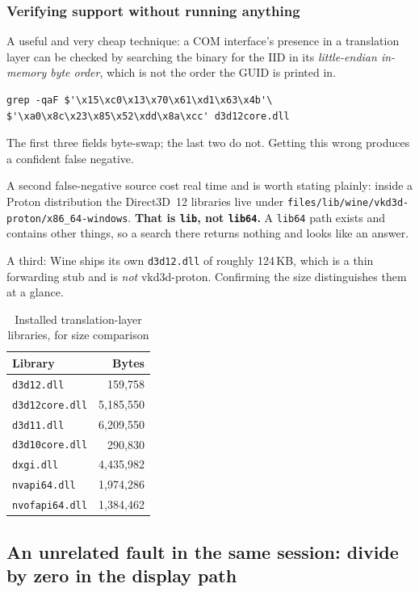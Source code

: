 \subsubsection{Verifying support without running anything}

A useful and very cheap technique: a COM interface's presence in a translation
layer can be checked by searching the binary for the IID in its
\emph{little-endian in-memory byte order}, which is not the order the GUID is
printed in.

\begin{lstlisting}
grep -qaF $'\x15\xc0\x13\x70\x61\xd1\x63\x4b'\
$'\xa0\x8c\x23\x85\x52\xdd\x8a\xcc' d3d12core.dll
\end{lstlisting}

The first three fields byte-swap; the last two do not. Getting this wrong
produces a confident false negative.

A second false-negative source cost real time and is worth stating plainly:
inside a Proton distribution the Direct3D~12 libraries live under
\verb|files/lib/wine/vkd3d-proton/x86_64-windows|. \textbf{That is
\texttt{lib}, not \texttt{lib64}.} A \verb|lib64| path exists and contains other
things, so a search there returns nothing and looks like an answer.

A third: Wine ships its own \verb|d3d12.dll| of roughly 124\,KB, which is a thin
forwarding stub and is \emph{not} vkd3d-proton. Confirming the size distinguishes
them at a glance.

\begin{table}[htbp]
\caption{Installed translation-layer libraries, for size comparison}
\label{tab:dlls}
\centering
\footnotesize
\begin{tabular}{@{}lr@{}}
\toprule
\textbf{Library} & \textbf{Bytes} \\
\midrule
\verb|d3d12.dll| & 159{,}758 \\
\verb|d3d12core.dll| & 5{,}185{,}550 \\
\verb|d3d11.dll| & 6{,}209{,}550 \\
\verb|d3d10core.dll| & 290{,}830 \\
\verb|dxgi.dll| & 4{,}435{,}982 \\
\verb|nvapi64.dll| & 1{,}974{,}286 \\
\verb|nvofapi64.dll| & 1{,}384{,}462 \\
\bottomrule
\end{tabular}
\end{table}

\subsection{An unrelated fault in the same session: divide by zero in the display path}

